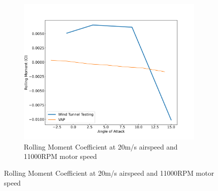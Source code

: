 \begin{figure}[H]
    \begin{subfigure}[b]{0.467\textwidth}
        \centering
        \includegraphics[width=\textwidth]{05_Results/VAP/noProp/Cl/20ms_11000RPM_Cl.png}
        \caption{Rolling Moment Coefficient at 20m/s airspeed and 11000RPM motor speed}
        \label{fig:VAP_NoProp_Cl_20ms_11000}
    \end{subfigure}
\end{figure}


